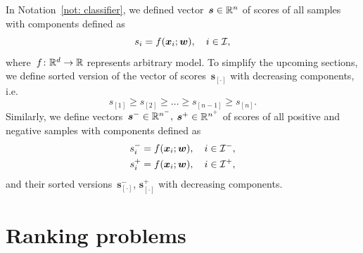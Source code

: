 \begin{notation}\label{not: scores}
  In Notation~\ref{not: classifier}, we defined vector~$\bm{s} \in \mathbb{R}^n$ of scores of all samples with components defined as
  \begin{equation*}
    s_i = f(\bm{x}_i; \bm{w}), \quad i \in \mathcal{I},
  \end{equation*}
  where~$f \colon \mathbb{R}^d \to \mathbb{R}$ represents arbitrary model. To simplify the upcoming sections, we define sorted version of the vector of scores~$\bm{s}_{[\cdot]}$ with decreasing components, i.e.
  \begin{equation*}
    s_{[1]}   \ge s_{[2]} \ge \dots \ge s_{[n - 1]} \ge s_{[n]}.
  \end{equation*}
  Similarly, we define vectors~$\bm{s}^- \in \mathbb{R}^{n^-},$ $\bm{s}^+ \in \mathbb{R}^{n^+}$ of scores of all positive and negative samples with components defined as
  \begin{equation*}
    \begin{aligned}
      s^-_i & = f(\bm{x}_i; \bm{w}), \quad i \in \mathcal{I}^-, \\
      s^+_i & = f(\bm{x}_i; \bm{w}), \quad i \in \mathcal{I}^+,
    \end{aligned}
  \end{equation*}
  and their sorted versions~$\bm{s}^-_{[\cdot]}$, $\bm{s}^+_{[\cdot]}$ with decreasing components.
\end{notation}

\section{Ranking problems}\label{sec:obj1}


